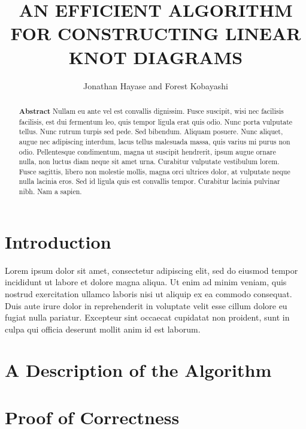 \documentclass{fkpaper}
\title{AN EFFICIENT ALGORITHM FOR CONSTRUCTING LINEAR KNOT DIAGRAMS}
\author{Jonathan Hayase and Forest Kobayashi}
\affiliation{Department of Mathematics, Harvey Mudd College,
  Claremont, CA, 91711}
\begin{document}



\begin{abstract}
  \textbf{Abstract} Nullam eu ante vel est convallis dignissim. Fusce
  suscipit, wisi nec facilisis facilisis, est dui fermentum leo, quis
  tempor ligula erat quis odio. Nunc porta vulputate tellus. Nunc
  rutrum turpis sed pede. Sed bibendum. Aliquam posuere. Nunc aliquet,
  augue nec adipiscing interdum, lacus tellus malesuada massa, quis
  varius mi purus non odio. Pellentesque condimentum, magna ut
  suscipit hendrerit, ipsum augue ornare nulla, non luctus diam neque
  sit amet urna. Curabitur vulputate vestibulum lorem. Fusce sagittis,
  libero non molestie mollis, magna orci ultrices dolor, at vulputate
  neque nulla lacinia eros. Sed id ligula quis est convallis tempor.
  Curabitur lacinia pulvinar nibh. Nam a sapien.
\end{abstract}


\begin{multicols}{2}
  \section{Introduction}
  Lorem ipsum dolor sit amet, consectetur adipiscing elit, sed do
  eiusmod tempor incididunt ut labore et dolore magna aliqua. Ut enim
  ad minim veniam, quis nostrud exercitation ullamco laboris nisi ut
  aliquip ex ea commodo consequat. Duis aute irure dolor in
  reprehenderit in voluptate velit esse cillum dolore eu fugiat nulla
  pariatur. Excepteur sint occaecat cupidatat non proident, sunt in
  culpa qui officia deserunt mollit anim id est laborum.


  \section{A Description of the Algorithm}


  \section{Proof of Correctness}


\end{multicols}




\nocite{*}
\end{document}
